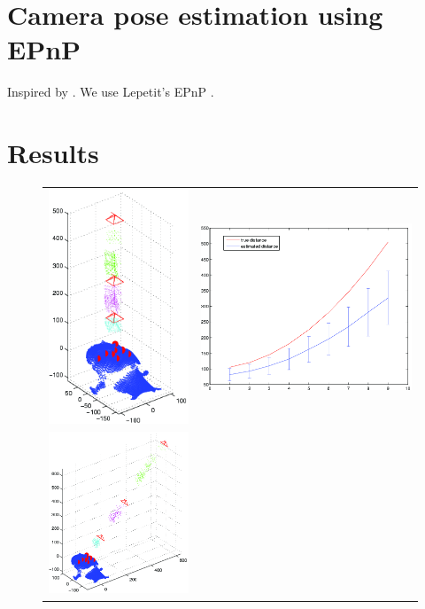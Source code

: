 \documentclass[runningheads]{llncs}
\begin{document}
\section{Camera pose estimation using EPnP}
Inspired by \cite{ohayon2006robust}.  We use Lepetit's EPnP \cite{lepetit2009epnp}.

\section{Results}

\begin{figure}[ht]
\begin{tabular}{cc}
\includegraphics[width=.45\linewidth]{resources/figures/cameraloc_frontal.png} &
\includegraphics[width=.45\linewidth]{resources/figures/errorbar_frontal.png} \\
\includegraphics[width=.45\linewidth]{resources/figures/cameraloc_3q.png} &

\end{tabular}
\end{figure}
\end{document}
